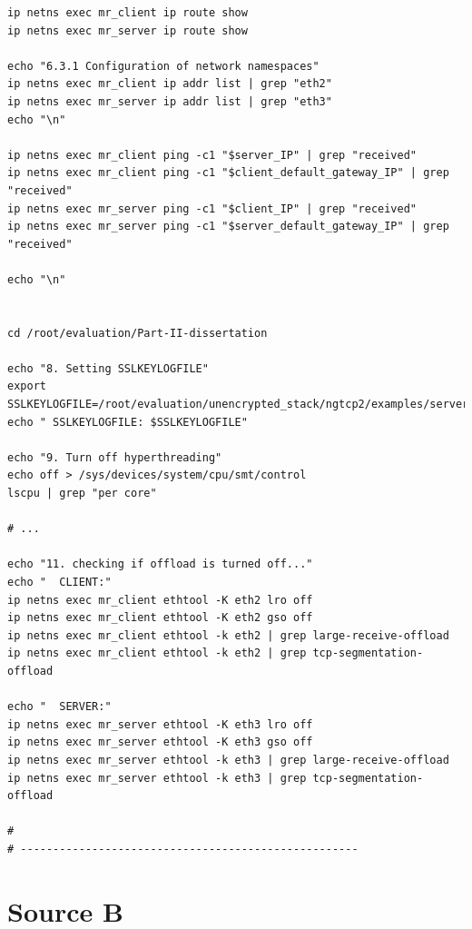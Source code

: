 \documentclass[12pt,a4paper,twoside,openright]{report}
\begin{document}
\begin{verbatim}
ip netns exec mr_client ip route show
ip netns exec mr_server ip route show

echo "6.3.1 Configuration of network namespaces"
ip netns exec mr_client ip addr list | grep "eth2"
ip netns exec mr_server ip addr list | grep "eth3"
echo "\n"

ip netns exec mr_client ping -c1 "$server_IP" | grep "received"
ip netns exec mr_client ping -c1 "$client_default_gateway_IP" | grep "received"
ip netns exec mr_server ping -c1 "$client_IP" | grep "received"
ip netns exec mr_server ping -c1 "$server_default_gateway_IP" | grep "received"

echo "\n"


cd /root/evaluation/Part-II-dissertation

echo "8. Setting SSLKEYLOGFILE"
export SSLKEYLOGFILE=/root/evaluation/unencrypted_stack/ngtcp2/examples/server.key
echo " SSLKEYLOGFILE: $SSLKEYLOGFILE"

echo "9. Turn off hyperthreading"
echo off > /sys/devices/system/cpu/smt/control
lscpu | grep "per core"

# ...

echo "11. checking if offload is turned off..."
echo "  CLIENT:"
ip netns exec mr_client ethtool -K eth2 lro off
ip netns exec mr_client ethtool -K eth2 gso off
ip netns exec mr_client ethtool -k eth2 | grep large-receive-offload
ip netns exec mr_client ethtool -k eth2 | grep tcp-segmentation-offload

echo "  SERVER:"
ip netns exec mr_server ethtool -K eth3 lro off
ip netns exec mr_server ethtool -K eth3 gso off
ip netns exec mr_server ethtool -k eth3 | grep large-receive-offload
ip netns exec mr_server ethtool -k eth3 | grep tcp-segmentation-offload

#
# ----------------------------------------------------

\end{verbatim}

\chapter{Source B}
\end{document}

